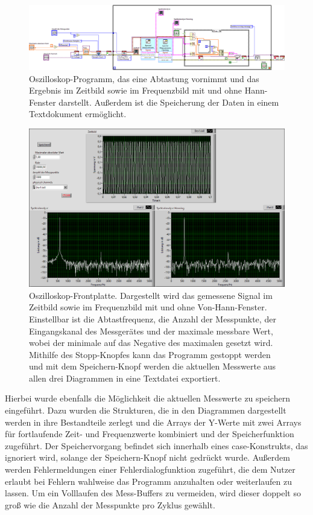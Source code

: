 \documentclass[
a4paper,
12pt,
pagesize,
ngerman
]{scrartcl}
\begin{document}
	\begin{figure}[H]  
		\includegraphics[width=1\textwidth]{EIRE2018Dateien/Tag3/ManuellVId}
		\centering
		\caption{
			Oszilloskop-Programm, das eine Abtastung vornimmt und das Ergebnis im Zeitbild sowie im Frequenzbild mit und ohne Hann-Fenster darstellt.
			Außerdem ist die Speicherung der Daten in einem Textdokument ermöglicht.
		}
		\label{fig_tag23_oszi_manuell_block}
		\centering
	\end{figure}

	\begin{figure}[H]  
		\includegraphics[width=1\textwidth]{EIRE2018Dateien/Tag3/ManuellVIp}
		\centering
		\caption{
			Oszilloskop-Frontplatte. Dargestellt wird das gemessene Signal im Zeitbild sowie im Frequenzbild mit und ohne Von-Hann-Fenster. Einstellbar ist die Abtastfrequenz, die Anzahl der Messpunkte, der Eingangskanal des Messgerätes und der maximale messbare Wert, wobei der minimale auf das Negative des maximalen gesetzt wird.
			Mithilfe des Stopp-Knopfes kann das Programm gestoppt werden und mit dem Speichern-Knopf werden die aktuellen Messwerte aus allen drei Diagrammen in eine Textdatei exportiert.
		}
		\label{fig_tag23_oszi_manuell_front}
		\centering
	\end{figure}

	Hierbei wurde ebenfalls die Möglichkeit die aktuellen Messwerte zu speichern eingeführt.
	Dazu wurden die Strukturen, die in den Diagrammen dargestellt werden in ihre Bestandteile zerlegt und die Arrays der Y-Werte mit zwei Arrays für fortlaufende Zeit- und Frequenzwerte kombiniert und der Speicherfunktion zugeführt.
	Der Speichervorgang befindet sich innerhalb eines case-Konstrukts, das ignoriert wird, solange der Speichern-Knopf nicht gedrückt wurde.
	Außerdem werden Fehlermeldungen einer Fehlerdialogfunktion zugeführt, die dem Nutzer erlaubt bei Fehlern wahlweise das Programm anzuhalten oder weiterlaufen zu lassen.
	Um ein Volllaufen des Mess-Buffers zu vermeiden, wird dieser doppelt so groß wie die Anzahl der Messpunkte pro Zyklus gewählt.
	
\end{document}
